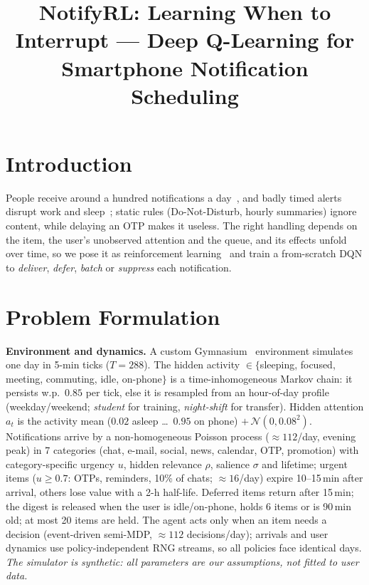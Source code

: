 \documentclass[conference,10pt]{IEEEtran}
\begin{document}
\title{NotifyRL: Learning When to Interrupt --- Deep Q-Learning for Smartphone Notification Scheduling}
\author{
}
\maketitle

\section{Introduction}
People receive around a hundred notifications a day~\cite{pielot2014insitu}, and badly timed alerts disrupt work and sleep~\cite{mehrotra2016myphone,okoshi2015attelia,ho2005context}; static rules (Do-Not-Disturb, hourly summaries) ignore content, while delaying an OTP makes it useless. The right handling depends on the item, the user's unobserved attention and the queue, and its effects unfold over time, so we pose it as reinforcement learning~\cite{sutton2018reinforcement} and train a from-scratch DQN to \emph{deliver}, \emph{defer}, \emph{batch} or \emph{suppress} each notification.

\section{Problem Formulation}
\textbf{Environment and dynamics.} A custom Gymnasium~\cite{towers2024gymnasium} environment simulates one day in 5-min ticks ($T{=}288$). The hidden activity $\in\{$sleeping, focused, meeting, commuting, idle, on-phone$\}$ is a time-inhomogeneous Markov chain: it persists w.p.\ $0.85$ per tick, else it is resampled from an hour-of-day profile (weekday/weekend; \emph{student} for training, \emph{night-shift} for transfer). Hidden attention $a_t$ is the activity mean ($0.02$ asleep \dots\ $0.95$ on phone) $+\,\mathcal N(0,0.08^2)$. Notifications arrive by a non-homogeneous Poisson process (${\approx}112$/day, evening peak) in 7 categories (chat, e-mail, social, news, calendar, OTP, promotion) with category-specific urgency $u$, hidden relevance $\rho$, salience $\sigma$ and lifetime; urgent items ($u{\ge}0.7$: OTPs, reminders, 10\% of chats; ${\approx}16$/day) expire 10--15\,min after arrival, others lose value with a 2-h half-life. Deferred items return after 15\,min; the digest is released when the user is idle/on-phone, holds 6 items or is 90\,min old; at most 20 items are held. The agent acts only when an item needs a decision (event-driven semi-MDP, ${\approx}112$ decisions/day); arrivals and user dynamics use policy-independent RNG streams, so all policies face identical days. \emph{The simulator is synthetic: all parameters are our assumptions, not fitted to user data.}
\end{document}
